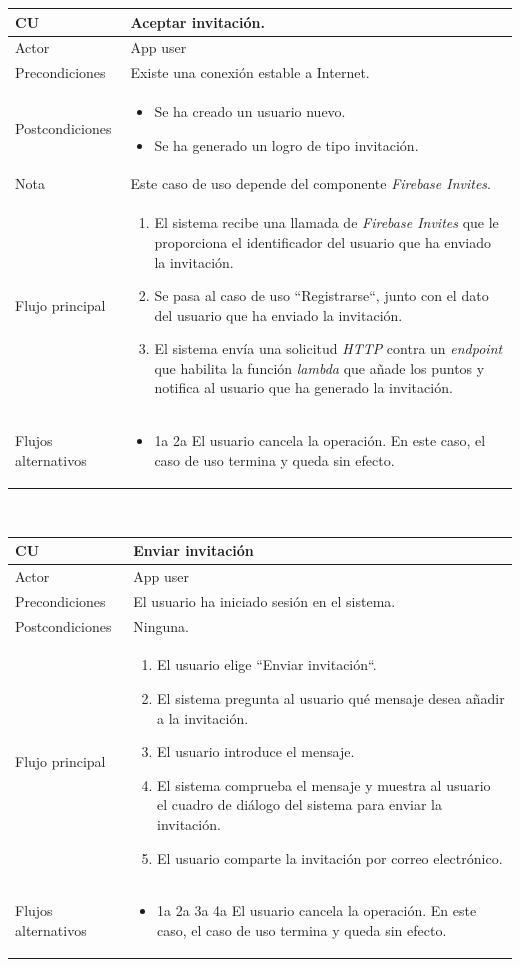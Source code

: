\documentclass[twoside]{report}
\newcommand\addrow[2]{#1 &#2\\ }
\newcommand\addheading[2]{#1 &#2\\ \hline}
\newcommand\tabularhead{\begin{tabular}{lp{0.7\textwidth}}
\hline
}
\newenvironment{usecase}{\tabularhead}
{\hline\end{tabular}}
\begin{document}
\begin{usecase}
  \addheading{\textbf{CU\arabic{usecase}}}{Aceptar invitación.} 
  \addrow{Actor}{App user}
  \addrow{Precondiciones}{Existe una conexión estable a Internet.}
  \addrow{Postcondiciones}{
  		\begin{itemize}
  		\item Se ha creado un usuario nuevo.
  		\item Se ha generado un logro de tipo invitación.
  		\end{itemize}
  }
  \addrow{Nota}{Este caso de uso depende del componente \textit{Firebase Invites}.}
  \addrow{Flujo principal}{
  		\begin{enumerate}
  		\item El sistema recibe una llamada de \textit{Firebase Invites} que le proporciona el identificador del usuario que ha enviado la invitación. %
  		\item Se pasa al caso de uso “Registrarse“, junto con el dato del usuario que ha enviado la invitación. %
  		\item El sistema envía una solicitud \textit{HTTP} contra un \textit{endpoint} que habilita la función \textit{lambda} que añade los puntos y notifica al usuario que ha generado la invitación. %
  		\end{enumerate}
  }
  \addrow{Flujos alternativos}{
  		\begin{itemize}
  		\item 1a 2a El usuario cancela la operación. En este caso, el caso de uso termina y queda sin efecto.
  		\end{itemize}
  }
\end{usecase}\\

\vspace{0.5cm}

\begin{usecase}
  \addheading{\textbf{CU\arabic{usecase}}}{Enviar invitación} 
  \addrow{Actor}{App user}
  \addrow{Precondiciones}{El usuario ha iniciado sesión en el sistema.}
  \addrow{Postcondiciones}{Ninguna.}
  \addrow{Flujo principal}{
  		\begin{enumerate}
  		\item El usuario elige “Enviar invitación“. %
  		\item El sistema pregunta al usuario qué mensaje desea añadir a la invitación. %
  		\item El usuario introduce el mensaje. %
  		\item El sistema comprueba el mensaje y muestra al usuario el cuadro de diálogo del sistema para enviar la invitación. %
  		\item El usuario comparte la invitación por correo electrónico. %
  		\end{enumerate}
  }
  \addrow{Flujos alternativos}{
  		\begin{itemize}
  		\item 1a 2a 3a 4a El usuario cancela la operación. En este caso, el caso de uso termina y queda sin efecto.
  		\end{itemize}
  }
\end{usecase}\\
\end{document}
